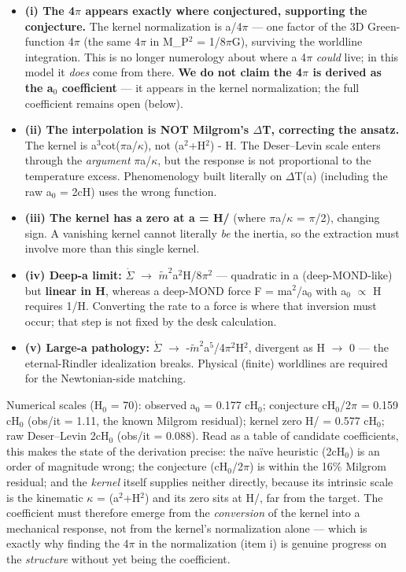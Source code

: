 \documentclass[aps,prd,preprint,nofootinbib,superscriptaddress]{revtex4-2}
\providecommand{\tightlist}{\setlength{\itemsep}{0pt}\setlength{\parskip}{0pt}}
\begin{document}
\begin{itemize}
\tightlist
\item
  \textbf{(i) The 4\(\pi\) appears exactly where conjectured, supporting
  the conjecture.} The kernel normalization is a/4\(\pi\) --- one factor
  of the 3D Green-function 4\(\pi\) (the same 4\(\pi\) in M\_P\(^{2}\) =
  1/8\(\pi\)G), surviving the worldline integration. This is no longer
  numerology about where a 4\(\pi\) \emph{could} live; in this model it
  \emph{does} come from there. \textbf{We do not claim the 4\(\pi\) is
  derived as the a\(_{0}\) coefficient} --- it appears in the kernel
  normalization; the full coefficient remains open (below).
\item
  \textbf{(ii) The interpolation is NOT Milgrom's \(\Delta\)T,
  correcting the ansatz.} The kernel is
  a\(^{3}\)cot(\(\pi\)a/\(\kappa\)), not \surd (a\(^{2}\)+H\(^{2}\)) -
  H. The Deser--Levin scale enters through the \emph{argument}
  \(\pi\)a/\(\kappa\), but the response is not proportional to the
  temperature excess. Phenomenology built literally on \(\Delta\)T(a)
  (including the raw a\(_{0}\) = 2cH) uses the wrong function.
\item
  \textbf{(iii) The kernel has a zero at a = H/} (where
  \(\pi\)a/\(\kappa\) = \(\pi\)/2), changing sign. A vanishing kernel
  cannot literally \emph{be} the inertia, so the extraction must involve
  more than this single kernel.
\item
  \textbf{(iv) Deep-a limit:} \(\dot{\Sigma}\) \(\to\)
  \(\tilde{m}^{2}\)a\(^{2}\)H/8\(\pi^{2}\) --- quadratic in a
  (deep-MOND-like) but \textbf{linear in H}, whereas a deep-MOND force F
  = ma\(^{2}\)/a\(_{0}\) with a\(_{0}\) \(\propto\) H requires 1/H.
  Converting the rate to a force is where that inversion must occur;
  that step is not fixed by the desk calculation.
\item
  \textbf{(v) Large-a pathology:} \(\dot{\Sigma}\) \(\to\)
  -\(\tilde{m}^{2}\)a\(^{5}\)/4\(\pi^{2}\)H\(^{2}\), divergent as H
  \(\to\) 0 --- the eternal-Rindler idealization breaks. Physical
  (finite) worldlines are required for the Newtonian-side matching.
\end{itemize}

Numerical scales (H\(_{0}\) = 70): observed a\(_{0}\) = 0.177
cH\(_{0}\); conjecture cH\(_{0}\)/2\(\pi\) = 0.159 cH\(_{0}\) (obs/it =
1.11, the known Milgrom residual); kernel zero H/ = 0.577
cH\(_{0}\); raw Deser--Levin 2cH\(_{0}\) (obs/it = 0.088). Read as a
table of candidate coefficients, this makes the state of the derivation
precise: the naïve heuristic (2cH\(_{0}\)) is an order of magnitude
wrong; the conjecture (cH\(_{0}\)/2\(\pi\)) is within the 16\% Milgrom
residual; and the \emph{kernel} itself supplies neither directly,
because its intrinsic scale is the kinematic \(\kappa\) =
\surd (a\(^{2}\)+H\(^{2}\)) and its zero sits at H/, far from the
target. The coefficient must therefore emerge from the \emph{conversion}
of the kernel into a mechanical response, not from the kernel's
normalization alone --- which is exactly why finding the 4\(\pi\) in the
normalization (item i) is genuine progress on the \emph{structure}
without yet being the coefficient.
\end{document}
